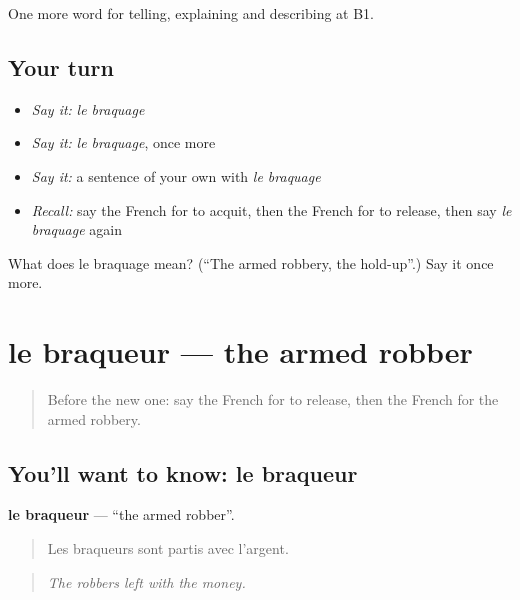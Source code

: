 \begin{grammarlens}[title={What you've built}]
One more word for telling, explaining and describing at B1.
\end{grammarlens}

\subsection*{Your turn}
\begin{itemize}
\raggedright
  \item \emph{Say it:} \emph{le braquage}
  \item \emph{Say it:} \emph{le braquage}, once more
  \item \emph{Say it:} a sentence of your own with \emph{le braquage}
  \item \emph{Recall:} say the French for to acquit, then the French for to release, then say \emph{le braquage} again
\end{itemize}

\begin{tcolorbox}[breakable,colback=teal!4,colframe=teal!35!black,title={Before you move on}]
What does le braquage mean? (\textquotedblleft{}The armed robbery, the hold-up\textquotedblright{}.) Say it once more.
\end{tcolorbox}
\section[le braqueur]{le braqueur — the armed robber}

\label{lesson:FR-C296-braqueur}



\begin{quote}
Before the new one: say the French for to release, then the French for the armed robbery.
\end{quote}

\subsection*{You'll want to know: le braqueur}
\textbf{le braqueur} — \textquotedblleft{}the armed robber\textquotedblright{}.

\begin{quote}
Les braqueurs sont partis avec l'argent.
\end{quote}

\begin{quote}
\emph{The robbers left with the money.}
\end{quote}

